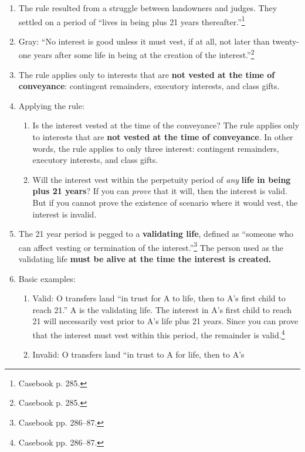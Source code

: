 \begin{enumerate}
    \item The rule resulted from a struggle between landowners and judges. 
    They settled on a period of ``lives in being plus 21 years 
    thereafter.''\footnote{Casebook p. 285.}
    \item Gray: ``No interest is good unless it must vest, if at all, not 
    later than twenty-one years after some life in being at the creation of 
    the interest.''\footnote{Casebook p. 285.}
    \item The rule applies only to interests that are \textbf{not vested at 
    the time of conveyance}: contingent remainders, executory 
    interests, and class gifts.
    \item Applying the rule:
    \begin{enumerate}
        \item Is the interest vested at the time of the conveyance? The rule 
        applies only to interests that are \textbf{not vested at the time of 
        conveyance}. In other words, the rule applies to only three interest: 
        contingent remainders, executory interests, and class gifts.
        \item Will the interest vest within the perpetuity period of 
        \emph{any} \textbf{life in being plus 21 years}? If you can 
        \emph{prove} that it will, then the interest is valid. But if you 
        cannot prove the existence of scenario where it would vest, the 
        interest is invalid.
    \end{enumerate}
    \item The 21 year period is pegged to a \textbf{validating life}, defined 
    as ``someone who can affect vesting or termination of the 
    interest.''\footnote{Casebook pp. 286--87.} The person used as the 
    validating life \textbf{must be alive at the time the interest is created.}
    \item Basic examples:
    \begin{enumerate}
        \item Valid: O transfers land ``in trust for A to life, then to A's 
        first child to reach 21.'' A is the validating life. The interest in 
        A's first child to reach 21 will necessarily vest prior to A's life 
        plus 21 years. Since you can prove that the interest must vest within 
        this period, the remainder is valid.\footnote{Casebook pp. 286--87.}
        \item Invalid: O transfers land ``in trust to A for life, then to A's 

\end{enumerate}
\end{enumerate}
